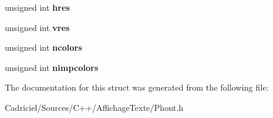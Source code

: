 \begin{DoxyCompactItemize}
\item 
\hypertarget{struct_phont_1_1bmp__dib__v3__header_ade4a135e8b3231c7e73f759fb25e3a19}{unsigned int {\bfseries hres}}\label{struct_phont_1_1bmp__dib__v3__header_ade4a135e8b3231c7e73f759fb25e3a19}

\item 
\hypertarget{struct_phont_1_1bmp__dib__v3__header_a69ab1c6252aa3de33322ef9d30cc9420}{unsigned int {\bfseries vres}}\label{struct_phont_1_1bmp__dib__v3__header_a69ab1c6252aa3de33322ef9d30cc9420}

\item 
\hypertarget{struct_phont_1_1bmp__dib__v3__header_ac8e7313876034869a1dddbede666a614}{unsigned int {\bfseries ncolors}}\label{struct_phont_1_1bmp__dib__v3__header_ac8e7313876034869a1dddbede666a614}

\item 
\hypertarget{struct_phont_1_1bmp__dib__v3__header_ab0cd60d45fc6bd23deefd953e2e17e41}{unsigned int {\bfseries nimpcolors}}\label{struct_phont_1_1bmp__dib__v3__header_ab0cd60d45fc6bd23deefd953e2e17e41}

\end{DoxyCompactItemize}


The documentation for this struct was generated from the following file\-:\begin{DoxyCompactItemize}
\item 
Cadriciel/\-Sources/\-C++/\-Affichage\-Texte/Phont.\-h\end{DoxyCompactItemize}
